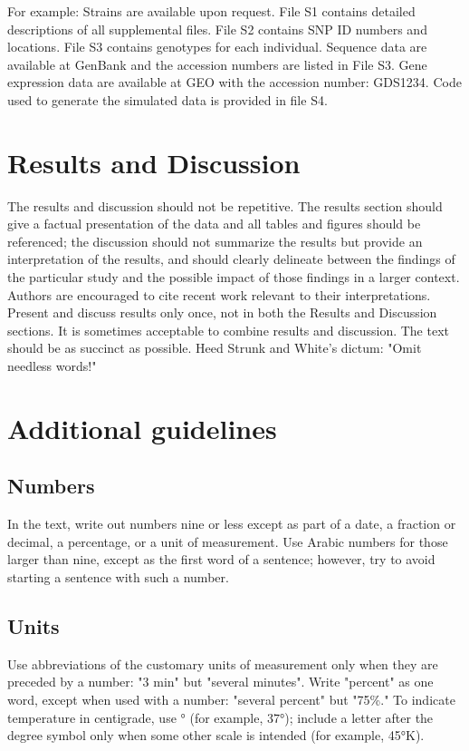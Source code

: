 \documentclass[9pt,twocolumn,twoside]{g3_article/gsag3jnl}
\begin{document}
For example: Strains are available upon request. File S1 contains detailed descriptions of all supplemental files. File S2 contains SNP ID numbers and locations. File S3 contains genotypes for each individual. Sequence data are available at GenBank and the accession numbers are listed in File S3. Gene expression data are available at GEO with the accession number: GDS1234. Code used to generate the simulated data is provided in file S4. 

\section*{Results and Discussion}

The results and discussion should not be repetitive. The results section should give a factual presentation of the data and all tables and figures should be referenced; the discussion should not summarize the results but provide an interpretation of the results, and should clearly delineate between the findings of the particular study and the possible impact of those findings in a larger context. Authors are encouraged to cite recent work relevant to their interpretations. Present and discuss results only once, not in both the Results and Discussion sections. It is sometimes acceptable to combine results and discussion. The text should be as succinct as possible. Heed Strunk and White's dictum: "Omit needless words!"

\section*{Additional guidelines}

\subsection*{Numbers} In the text, write out numbers nine or less except as part of a date, a fraction or decimal, a percentage, or a unit of measurement. Use Arabic numbers for those larger than nine, except as the first word of a sentence; however, try to avoid starting a sentence with such a number.

\subsection*{Units} Use abbreviations of the customary units of measurement only when they are preceded by a number: "3 min" but "several minutes". Write "percent" as one word, except when used with a number: "several percent" but "75\%." To indicate temperature in centigrade, use ° (for example, 37°); include a letter after the degree symbol only when some other scale is intended (for example, 45°K).
\end{document}
